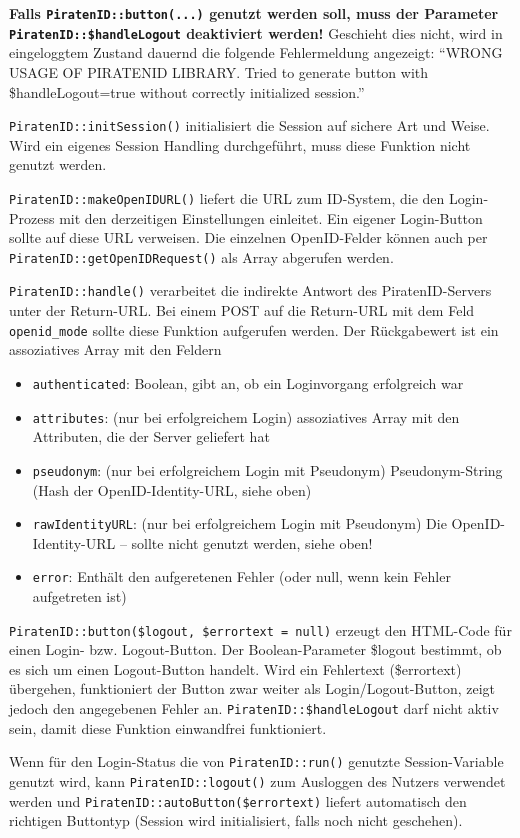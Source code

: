 \textbf{Falls \texttt{PiratenID::button(...)} genutzt werden soll, muss der Parameter \texttt{PiratenID::\$handleLogout} deaktiviert werden!}
Geschieht dies nicht, wird in eingeloggtem Zustand dauernd die folgende Fehlermeldung angezeigt:
"`WRONG USAGE OF PIRATENID LIBRARY. Tried to generate button with \$handleLogout=true without correctly initialized session."'

\texttt{PiratenID::initSession()} initialisiert die Session auf sichere Art und Weise.
Wird ein eigenes Session Handling durchgeführt, muss diese Funktion nicht genutzt werden.

\texttt{PiratenID::makeOpenIDURL()} liefert die URL zum ID-System, die den Login-Prozess mit den derzeitigen Einstellungen einleitet.
Ein eigener Login-Button sollte auf diese URL verweisen.
Die einzelnen OpenID-Felder können auch per \texttt{PiratenID::getOpenIDRequest()} als Array abgerufen werden.

\texttt{PiratenID::handle()} verarbeitet die indirekte Antwort des PiratenID-Servers unter der Return-URL.
Bei einem POST auf die Return-URL mit dem Feld \texttt{openid\_mode} sollte diese Funktion aufgerufen werden.
Der Rückgabewert ist ein assoziatives Array mit den Feldern 
\begin{itemize}
	\item \texttt{authenticated}: Boolean, gibt an, ob ein Loginvorgang erfolgreich war
	\item \texttt{attributes}: (nur bei erfolgreichem Login) assoziatives Array mit den Attributen, die der Server geliefert hat
	\item \texttt{pseudonym}: (nur bei erfolgreichem Login mit Pseudonym) Pseudonym-String (Hash der OpenID-Identity-URL, siehe oben)
	\item \texttt{rawIdentityURL}: (nur bei erfolgreichem Login mit Pseudonym) Die OpenID-Identity-URL -- sollte nicht genutzt werden, siehe oben!
	\item \texttt{error}: Enthält den aufgeretenen Fehler (oder null, wenn kein Fehler aufgetreten ist)
\end{itemize}

\texttt{PiratenID::button(\$logout, \$errortext = null)} erzeugt den HTML-Code für einen Login- bzw. Logout-Button.
Der Boolean-Parameter \$logout bestimmt, ob es sich um einen Logout-Button handelt.
Wird ein Fehlertext (\$errortext) übergehen, funktioniert der Button zwar weiter als Login/Logout-Button,
zeigt jedoch den angegebenen Fehler an.
\texttt{PiratenID::\$handleLogout} darf nicht aktiv sein, damit diese Funktion einwandfrei funktioniert.

Wenn für den Login-Status die von \texttt{PiratenID::run()} genutzte Session-Variable genutzt wird,
kann \texttt{PiratenID::logout()} zum Ausloggen des Nutzers verwendet werden und
\texttt{PiratenID::autoButton(\$errortext)} liefert automatisch den richtigen Buttontyp
(Session wird initialisiert, falls noch nicht geschehen).
